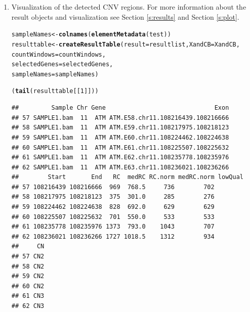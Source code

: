 \documentclass[article]{bioinf}\usepackage[]{graphicx}\usepackage[]{color}
\makeatletter
\newcommand{\hlnum}[1]{\textcolor[rgb]{0.686,0.059,0.569}{#1}}%
\newcommand{\hlstd}[1]{\textcolor[rgb]{0.345,0.345,0.345}{#1}}%
\newcommand{\hlkwb}[1]{\textcolor[rgb]{0.69,0.353,0.396}{#1}}%
\newcommand{\hlkwc}[1]{\textcolor[rgb]{0.333,0.667,0.333}{#1}}%
\newcommand{\hlkwd}[1]{\textcolor[rgb]{0.737,0.353,0.396}{\textbf{#1}}}%
\newenvironment{kframe}{%
 \def\at@end@of@kframe{}%
 \ifinner\ifhmode%
  \def\at@end@of@kframe{\end{minipage}}%
  \begin{minipage}{\columnwidth}%
 \fi\fi%
 \def\FrameCommand##1{\hskip\@totalleftmargin \hskip-\fboxsep
 \colorbox{shadecolor}{##1}\hskip-\fboxsep
     \hskip-\linewidth \hskip-\@totalleftmargin \hskip\columnwidth}%
 \MakeFramed {\advance\hsize-\width
   \@totalleftmargin\z@ \linewidth\hsize
   \@setminipage}}%
 {\par\unskip\endMakeFramed%
 \at@end@of@kframe}
\newenvironment{knitrout}{}{} %
\makeatother
\begin{document}
\begin{enumerate}
\item Visualization of the detected CNV regions. For more information about
the result objects and visualization see Section \ref{s:results} and 
Section \ref{s:plot}.






\begin{knitrout}
\color{fgcolor}\begin{kframe}
\begin{alltt}
\hlstd{sampleNames} \hlkwb{<-} \hlkwd{colnames}\hlstd{(}\hlkwd{elementMetadata}\hlstd{(test))}
\hlstd{resulttable} \hlkwb{<-} \hlkwd{createResultTable}\hlstd{(}\hlkwc{result} \hlstd{= resultlist,} \hlkwc{XandCB} \hlstd{= XandCB,}
                                    \hlkwc{countWindows} \hlstd{= countWindows,}
                                    \hlkwc{selectedGenes} \hlstd{= selectedGenes,}
                                    \hlkwc{sampleNames} \hlstd{= sampleNames)}
\end{alltt}


{\ttfamily\noindent\itshape\color{messagecolor}{\#\# Calculating results for sample(s) SAMPLE1.bam}}

{\ttfamily\noindent\itshape\color{messagecolor}{\#\# Building table...}}

{\ttfamily\noindent\itshape\color{messagecolor}{\#\# Finished}}\begin{alltt}
\hlstd{(}\hlkwd{tail}\hlstd{(resulttable[[}\hlnum{1}\hlstd{]]))}
\end{alltt}
\begin{verbatim}
##         Sample Chr Gene                              Exon
## 57 SAMPLE1.bam  11  ATM ATM.E58.chr11.108216439.108216666
## 58 SAMPLE1.bam  11  ATM ATM.E59.chr11.108217975.108218123
## 59 SAMPLE1.bam  11  ATM ATM.E60.chr11.108224462.108224638
## 60 SAMPLE1.bam  11  ATM ATM.E61.chr11.108225507.108225632
## 61 SAMPLE1.bam  11  ATM ATM.E62.chr11.108235778.108235976
## 62 SAMPLE1.bam  11  ATM ATM.E63.chr11.108236021.108236266
##        Start       End   RC  medRC RC.norm medRC.norm lowQual
## 57 108216439 108216666  969  768.5     736        702        
## 58 108217975 108218123  375  301.0     285        276        
## 59 108224462 108224638  828  692.0     629        629        
## 60 108225507 108225632  701  550.0     533        533        
## 61 108235778 108235976 1373  793.0    1043        707        
## 62 108236021 108236266 1727 1018.5    1312        934        
##     CN
## 57 CN2
## 58 CN2
## 59 CN2
## 60 CN2
## 61 CN3
## 62 CN3
\end{verbatim}
\end{kframe}
\end{knitrout}




\end{enumerate}
\end{document}
